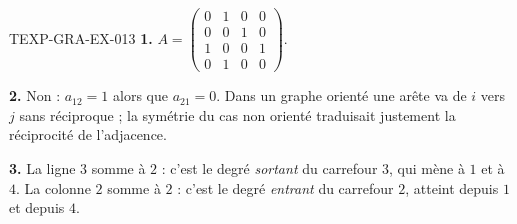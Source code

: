 \begin{corrige}{TEXP-GRA-EX-013}
\textbf{1.} $A=\begin{pmatrix}0&1&0&0\\0&0&1&0\\1&0&0&1\\0&1&0&0\end{pmatrix}$.

\textbf{2.} Non : $a_{12}=1$ alors que $a_{21}=0$. Dans un graphe orienté une
arête va de $i$ vers $j$ sans réciproque ; la symétrie du cas non orienté
traduisait justement la réciprocité de l'adjacence.

\textbf{3.} La ligne $3$ somme à $2$ : c'est le degré \emph{sortant} du
carrefour $3$, qui mène à $1$ et à $4$. La colonne $2$ somme à $2$ : c'est le
degré \emph{entrant} du carrefour $2$, atteint depuis $1$ et depuis $4$.
\end{corrige}
